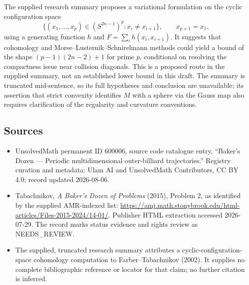 \documentclass[11pt]{article}
\begin{document}
The supplied research summary proposes a variational formulation on the cyclic configuration space
\[
 \{(x_1,\ldots,x_p)\in(S^{2n-1})^p:x_i\ne x_{i+1}\},\qquad x_{p+1}=x_1,
\]
using a generating function $h$ and $F=\sum_i h(x_i,x_{i+1})$. It suggests that cohomology and Morse--Lusternik--Schnirelmann methods could yield a bound of the shape $(p-1)(2n-2)+1$ for prime $p$, conditional on resolving the compactness issue near collision diagonals. This is a proposed route in the supplied summary, not an established lower bound in this draft. The summary is truncated mid-sentence, so its full hypotheses and conclusion are unavailable; its assertion that strict convexity identifies $M$ with a sphere via the Gauss map also requires clarification of the regularity and curvature conventions.
\subsection{Sources}
\begin{itemize}
\item UnsolvedMath permanent ID 600006, source code catalogue entry, ``Baker's Dozen --- Periodic multidimensional outer-billiard trajectories.'' Registry curation and metadata: Ulam AI and UnsolvedMath Contributors, CC BY 4.0; record updated 2026-08-06.
\item Tabachnikov, \emph{A Baker's Dozen of Problems} (2015), Problem 2, as identified by the supplied AMR-indexed list: \url{https://amj.math.stonybrook.edu/html-articles/Files-2015-2024/14-01/}. Publisher HTML extraction accessed 2026-07-29. The record marks status evidence and rights review as NEEDS\_REVIEW.
\item The supplied, truncated research summary attributes a cyclic-configuration-space cohomology computation to Farber--Tabachnikov (2002). It supplies no complete bibliographic reference or locator for that claim; no further citation is inferred.
\end{itemize}
\end{document}
